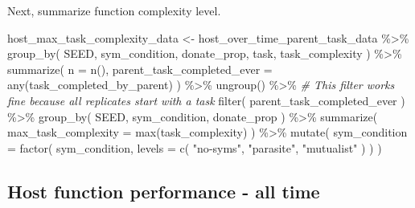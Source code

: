 \documentclass[
]{book}
\newenvironment{Shaded}{\begin{snugshade}}{\end{snugshade}}
\newcommand{\AttributeTok}[1]{\textcolor[rgb]{0.77,0.63,0.00}{#1}}
\newcommand{\CommentTok}[1]{\textcolor[rgb]{0.56,0.35,0.01}{\textit{#1}}}
\newcommand{\FunctionTok}[1]{\textcolor[rgb]{0.00,0.00,0.00}{#1}}
\newcommand{\NormalTok}[1]{#1}
\newcommand{\OtherTok}[1]{\textcolor[rgb]{0.56,0.35,0.01}{#1}}
\newcommand{\SpecialCharTok}[1]{\textcolor[rgb]{0.00,0.00,0.00}{#1}}
\newcommand{\StringTok}[1]{\textcolor[rgb]{0.31,0.60,0.02}{#1}}
\begin{document}
Next, summarize function complexity level.

\begin{Shaded}
\begin{Highlighting}[]
\NormalTok{host\_max\_task\_complexity\_data }\OtherTok{\textless{}{-}}\NormalTok{ host\_over\_time\_parent\_task\_data }\SpecialCharTok{\%\textgreater{}\%}
  \FunctionTok{group\_by}\NormalTok{(}
\NormalTok{    SEED,}
\NormalTok{    sym\_condition,}
\NormalTok{    donate\_prop,}
\NormalTok{    task,}
\NormalTok{    task\_complexity}
\NormalTok{  ) }\SpecialCharTok{\%\textgreater{}\%}
  \FunctionTok{summarize}\NormalTok{(}
    \AttributeTok{n =} \FunctionTok{n}\NormalTok{(),}
    \AttributeTok{parent\_task\_completed\_ever =} \FunctionTok{any}\NormalTok{(task\_completed\_by\_parent)}
\NormalTok{  ) }\SpecialCharTok{\%\textgreater{}\%}
  \FunctionTok{ungroup}\NormalTok{() }\SpecialCharTok{\%\textgreater{}\%}
  \CommentTok{\# This filter works fine because all replicates start with a task}
  \FunctionTok{filter}\NormalTok{(}
\NormalTok{    parent\_task\_completed\_ever}
\NormalTok{  ) }\SpecialCharTok{\%\textgreater{}\%}
  \FunctionTok{group\_by}\NormalTok{(}
\NormalTok{    SEED,}
\NormalTok{    sym\_condition,}
\NormalTok{    donate\_prop}
\NormalTok{  ) }\SpecialCharTok{\%\textgreater{}\%}
  \FunctionTok{summarize}\NormalTok{(}
    \AttributeTok{max\_task\_complexity =} \FunctionTok{max}\NormalTok{(task\_complexity)}
\NormalTok{  ) }\SpecialCharTok{\%\textgreater{}\%}
  \FunctionTok{mutate}\NormalTok{(}
    \AttributeTok{sym\_condition =} \FunctionTok{factor}\NormalTok{(}
\NormalTok{      sym\_condition,}
      \AttributeTok{levels =} \FunctionTok{c}\NormalTok{(}
        \StringTok{"no{-}syms"}\NormalTok{,}
        \StringTok{"parasite"}\NormalTok{,}
        \StringTok{"mutualist"}
\NormalTok{      )}
\NormalTok{    )}
\NormalTok{  )}
\end{Highlighting}
\end{Shaded}

\hypertarget{host-function-performance---all-time-3}{%
\subsection{Host function performance - all time}\label{host-function-performance---all-time-3}}
\end{document}
